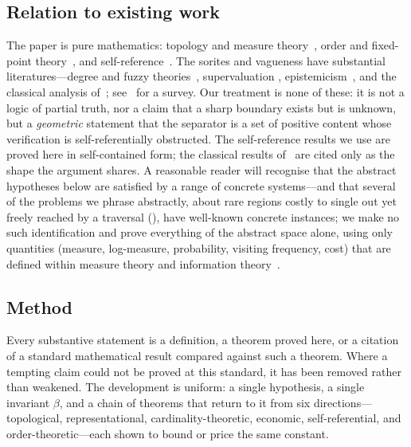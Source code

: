 \documentclass[11pt,a4paper]{article}
\theoremstyle{thmstyle}
\theoremstyle{definition}
\theoremstyle{remark}
\newcommand{\thick}{\beta}
\begin{document}
\subsection{Relation to existing work}

The paper is pure mathematics: topology and measure theory~\citep{kelley1955,%
munkres2000,halmos1950,federer1969,mattila1995,engelking1995,hurewicz1941},
order and fixed-point theory~\citep{birkhoff1967,daveypriestley2002,%
tarski1955}, and self-reference~\citep{russell1903,cantor1891,tarski1936,%
godel1931,lawvere1969}. The sorites and vagueness have substantial
literatures---degree and fuzzy theories~\citep{zadeh1965}, supervaluation
\citep{fine1975,keefe2000}, epistemicism~\citep{williamson1994}, and the
classical analysis of~\citet{black1937}; see~\citet{hyderaffman2018} for a
survey. Our treatment is none of these: it is not a logic of partial truth,
nor a claim that a sharp boundary exists but is unknown, but a
\emph{geometric} statement that the separator is a set of positive content
whose verification is self-referentially obstructed. The self-reference
results we use are proved here in self-contained form; the classical results
of~\citet{russell1903,cantor1891,tarski1936} are cited only as the shape the
argument shares. A reasonable reader will recognise that the abstract
hypotheses below are satisfied by a range of concrete systems---and that several
of the problems we phrase abstractly, about rare regions costly to single out yet
freely reached by a traversal (), have well-known concrete
instances; we make no such identification and prove everything of the abstract
space alone, using only quantities (measure, log-measure, probability, visiting
frequency, cost) that are defined within measure theory and information
theory~\citep{shannon1948,cover2006}.

\subsection{Method}

Every substantive statement is a definition, a theorem proved here, or a
citation of a standard mathematical result compared against such a theorem.
Where a tempting claim could not be proved at this standard, it has been
removed rather than weakened. The development is uniform: a single hypothesis,
a single invariant $\thick$, and a chain of theorems that return to it from
six directions---topological, representational, cardinality-theoretic,
economic, self-referential, and order-theoretic---each shown to bound or price
the same constant.
\end{document}
